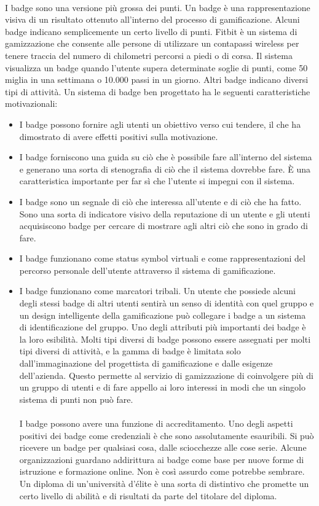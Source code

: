 \\
I badge sono una versione più grossa dei punti. Un badge è una rappresentazione visiva di un risultato ottenuto all'interno del processo di gamificazione. Alcuni badge indicano semplicemente un certo livello di punti. Fitbit è un sistema di gamizzazione che consente alle persone di utilizzare un contapassi wireless per tenere traccia del numero di chilometri percorsi a piedi o di corsa. Il sistema visualizza un badge quando l'utente supera determinate soglie di punti, come 50 miglia in una settimana o 10.000 passi in un giorno.
Altri badge indicano diversi tipi di attività.
Un sistema di badge ben progettato ha le seguenti caratteristiche motivazionali:
\begin{itemize}
\item I badge possono fornire agli utenti un obiettivo verso cui tendere, il che ha dimostrato di avere effetti positivi sulla motivazione.
\item I badge forniscono una guida su ciò che è possibile fare all'interno del sistema e generano una sorta di stenografia di ciò che il sistema dovrebbe fare.
È una caratteristica importante per far sì che l'utente si impegni con il sistema.
\item I badge sono un segnale di ciò che interessa all'utente e di ciò che ha fatto.
Sono una sorta di indicatore visivo della reputazione di un utente e gli utenti acquisiscono badge per cercare di mostrare agli altri ciò che sono in grado di fare.
\item I badge funzionano come status symbol virtuali e come rappresentazioni del percorso personale dell'utente attraverso il sistema di gamificazione.
\item I badge funzionano come marcatori tribali. Un utente che possiede alcuni degli stessi badge di altri utenti sentirà un senso di identità con quel gruppo e un design intelligente della gamificazione può collegare i badge a un sistema di identificazione del gruppo.
Uno degli attributi più importanti dei badge è la loro esibilità. Molti tipi diversi di badge possono essere assegnati per molti tipi diversi di attività, e la gamma di badge è limitata solo dall'immaginazione del progettista di gamificazione e dalle esigenze dell'azienda.
Questo permette al servizio di gamizzazione di coinvolgere più di un gruppo di utenti e di fare appello ai loro interessi in modi che un singolo sistema di punti non può fare.\\
\\
I badge possono avere una funzione di accreditamento. Uno degli aspetti positivi dei badge come credenziali è che sono assolutamente esauribili. Si può ricevere un badge per qualsiasi cosa, dalle sciocchezze alle cose serie. Alcune organizzazioni guardano addirittura ai badge come base per nuove forme di istruzione e formazione online. Non è così assurdo come potrebbe sembrare. Un diploma di un'università d'élite è una sorta di distintivo che promette un certo livello di abilità e di risultati da parte del titolare del diploma.\\

\end{itemize}
